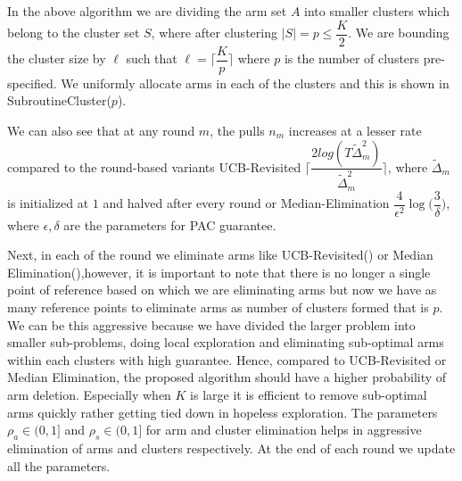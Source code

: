 In the above algorithm we are dividing the arm set $A$ into smaller clusters which belong to the cluster set $S$, where after clustering $|S|=p\leq \dfrac{K}{2}$. We are bounding the cluster size by $\ell$ such that $\ell=\bigg\lceil \dfrac{K}{p} \bigg\rceil$ where $p$ is the number of clusters pre-specified. We uniformly allocate arms in each of the clusters and this is shown in SubroutineCluster($p$).

We can also see that at any round $m$, the pulls $n_{m}$ increases at a lesser rate compared to the round-based variants UCB-Revisited $\bigg\lceil \dfrac{2log(T\tilde{\Delta}_{m}^{2})}{\tilde{\Delta}_{m}^{2}} \bigg\rceil$, where $\tilde{\Delta}_{m}$ is initialized at $1$ and halved after every round or Median-Elimination $\dfrac{4}{\epsilon^{2}}\log\big(\dfrac{3}{\delta}\big)$, where $\epsilon,\delta$ are the parameters for PAC guarantee.

	Next, in each of the round we eliminate arms like UCB-Revisited(\cite{auer2010ucb}) or Median Elimination(\cite{even2006action}),however, it is important to note that there is no longer a single point of reference based on which we are eliminating arms but now we have as many reference points to eliminate arms as number of clusters formed that is $p$. We can be this aggressive because we have divided the larger problem into smaller sub-problems, doing local exploration and eliminating sub-optimal arms within each clusters with high guarantee. Hence, compared to UCB-Revisited or Median Elimination, the proposed algorithm should have a higher probability of arm deletion. Especially when $K$ is large it is efficient to remove sub-optimal arms quickly rather getting tied down in hopeless exploration. The parameters $\rho_{a}\in (0,1]$ and $\rho_{s}\in (0,1]$ for arm and cluster elimination helps in aggressive elimination of arms and clusters respectively. At the end of each round we update all the  parameters.

